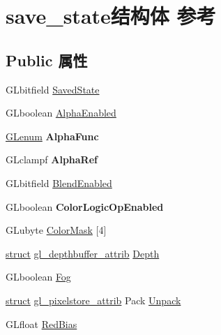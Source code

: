 \hypertarget{structsave__state}{}\section{save\+\_\+state结构体 参考}
\label{structsave__state}
\subsection*{Public 属性}
\begin{DoxyCompactItemize}
\item 
G\+Lbitfield \hyperlink{structsave__state_ae1a46ad7e49bd1681fdb1d8f0bc30de2}{Saved\+State}
\item 
G\+Lboolean \hyperlink{structsave__state_aa099b0921b6378be8a397c0d7565a983}{Alpha\+Enabled}
\item 
\mbox{\label{structsave__state_a2ca20fce43ee2e63816c2177324c4586}} 
\hyperlink{interfacevoid}{G\+Lenum} {\bfseries Alpha\+Func}
\item 
\mbox{\label{structsave__state_adc7b7351e015f913f9d3bb0c1dbf01c0}} 
G\+Lclampf {\bfseries Alpha\+Ref}
\item 
G\+Lbitfield \hyperlink{structsave__state_a8d42745fd29e5853d1dd46f9c7fffc98}{Blend\+Enabled}
\item 
\mbox{\label{structsave__state_a3ee41d94a4496040a0ce9ca7633c9dbd}} 
G\+Lboolean {\bfseries Color\+Logic\+Op\+Enabled}
\item 
G\+Lubyte \hyperlink{structsave__state_a2c332ae7121336b424bfdb72791dc380}{Color\+Mask} \mbox{[}4\mbox{]}
\item 
\hyperlink{interfacestruct}{struct} \hyperlink{structgl__depthbuffer__attrib}{gl\+\_\+depthbuffer\+\_\+attrib} \hyperlink{structsave__state_a4059d74afbea3278c3a411c1c6f57c48}{Depth}
\item 
G\+Lboolean \hyperlink{structsave__state_a89dc4516474ffb3832ba2ed8aa6c8a8e}{Fog}
\item 
\hyperlink{interfacestruct}{struct} \hyperlink{structgl__pixelstore__attrib}{gl\+\_\+pixelstore\+\_\+attrib} Pack \hyperlink{structsave__state_afda39d660e21a6085b681070f5e5cc0a}{Unpack}
\item 
G\+Lfloat \hyperlink{structsave__state_ada97182d05009f411e777ebd56768963}{Red\+Bias}
\item 
\mbox{\label{structsave__state_a6266142f2105f972b36f3c8bc2e8b6aa}} 

\end{DoxyCompactItemize}
